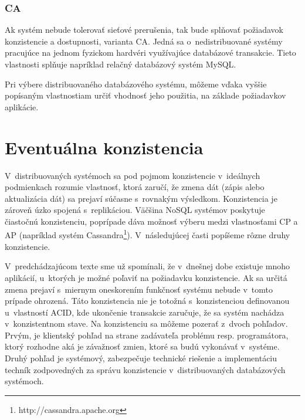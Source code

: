 \documentclass[11pt,twoside,a4paper]{book}
\begin{document}
\subsubsection*{CA}
Ak systém nebude tolerovať sieťové prerušenia, tak bude splňovať požiadavok konzistencie a dostupnosti, varianta CA. Jedná sa o~nedistribuované systémy pracujúce na jednom fyzickom hardvéri využívajúce databázové transakcie. Tieto vlastnosti splňuje napríklad relačný databázový systém MySQL.


Pri výbere distribuovaného databázového systému, môžeme vďaka vyššie popísaným vlastnostiam určiť vhodnosť jeho použitia, na základe požiadavkov aplikácie.
%




\section{Eventuálna konzistencia}
V~distribuovaných systémoch sa pod pojmom konzistencie v~ideálnych podmienkach rozumie vlastnosť, ktorá zaručí, že zmena dát (zápis alebo aktualizácia dát) sa prejaví súčasne s~rovnakým výsledkom. Konzistencia je zároveň úzko spojená s~replikáciou. Väčšina NoSQL systémov poskytuje čiastočnú konzistenciu, poprípade dáva možnosť výberu medzi vlastnosťami CP a AP (napríklad systém Cassandra\footnote{http://cassandra.apache.org}). V~následujúcej časti popíšeme rôzne druhy konzistencie.

V~predchádzajúcom texte sme už spomínali, že v~dnešnej dobe existuje mnoho aplikácií, u~ktorých je možné poľaviť na požiadavku konzistencie. Ak sa určitá zmena prejaví s~miernym oneskorením funkčnosť systému nebude v~tomto prípade ohrozená. Táto konzistencia nie je totožná s~konzistenciou definovanou u~vlastností ACID, kde ukončenie transakcie zaručuje, že sa systém nachádza v~konzistentnom stave. Na konzistenciu sa môžeme pozerať z~dvoch pohľadov. Prvým, je klientský pohľad na strane zadávateľa problému resp. programátora, ktorý rozhodne aká je závažnosť zmien, ktoré sa budú vykonávať v~systéme. Druhý pohľad je systémový, zabezpečuje technické riešenie a implementáciu techník zodpovedných za správu konzistencie v~distribuovaných databázových systémoch.
\end{document}
